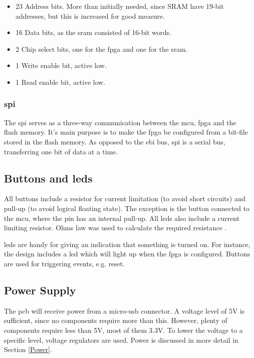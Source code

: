\begin{itemize}
\item 23 Address bits. More than initially needed, since SRAM have 19-bit addresses, but this is increased for good measure.
\item 16 Data bits, as the \gls{sram} consisted of 16-bit words.
\item 2 Chip select bits, one for the \gls{fpga} and one for the \gls{sram}.
\item 1 Write enable bit, active low.
\item 1 Read enable bit, active low.
\end{itemize}

\subsubsection{\gls{spi}}
The \gls{spi} serves as a three-way communication between the \gls{mcu}, \gls{fpga} and the flash memory.
It's main purpose is to make the \gls{fpga} be configured from a bit-file stored in the flash memory.
As opposed to the \gls{ebi} bus, \gls{spi} is a serial bus, transferring one bit of data at a time.

\subsection{Buttons and \gls{led}s}
All buttons include a resistor for current limitation (to avoid short circuits) and pull-up (to avoid logical floating state).
The exception is the button connected to the \gls{mcu}, where the pin has an internal pull-up.
All \gls{led}s also include a current limiting resistor.
Ohms law was used to calculate the required resistance \cite{ohm}.

\gls{led}s are handy for giving an indication that something is turned on.
For instance, the design includes a \gls{led} which will light up when the \gls{fpga} is configured.
Buttons are used for triggering events, e.g. reset.

\subsection{Power Supply}
The \gls{pcb} will receive power from a micro-\gls{usb} connector.
A voltage level of 5V is sufficient, since no components require more than this.
However, plenty of components require less than 5V, most of them 3.3V.
To lower the voltage to a specific level, voltage regulators are used.
Power is discussed in more detail in Section \ref{Power}.

